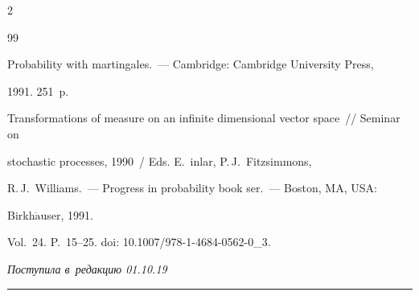 \begin{multicols}{2}
{{\begin{thebibliography}{99}


 Probability with martingales.~--- Cambridge: Cambridge University Press, 


1991. 251~p.




 Transformations of measure on an infinite dimensional vector space~// Seminar on 


stochastic processes, 1990~/ Eds. \mbox{E.~{}inlar}, P.\,J.~Fitzsimmons, 


R.\,J.~Williams.~--- Progress in probability book ser.~--- Boston, MA, USA:


Birkh$\ddot{\mbox{a}}$user, 1991. 


Vol.~24. P.~15--25. doi: 10.1007/978-1-4684-0562-0\_3.


\end{thebibliography}





 }


 }





\end{multicols}





\vspace*{-12pt}





\hfill{\small\textit{Поступила в~редакцию 01.10.19}}





\vspace*{6pt}




















\hrule





\vspace*{2pt}





